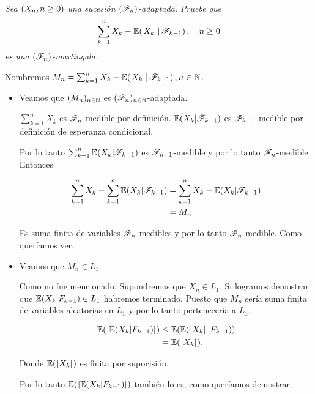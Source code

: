 \emph{
    Sea $\left( X_n,n\geq 0\right) $ una sucesi\'on $\left( \mathscr{F}_n\right) $-adaptada. Pruebe que
    \begin{align}
        \sum_{k=1}^n X_k-\espc{X_k}{\F_{k-1}}, \quad n\geq 0
    \end{align}
    es una $\left( \mathscr{F}_n\right) $-martingala.
}

\afterstatement\pn

Nombremos $M_n = \sum_{k=1}^n X_k-\espc{X_k}{\F_{k-1}}, n \in \N$.\pn

\begin{itemize}
	\item 
        Veamos que $(M_n)_{n \in \mathbb{N}}$ es $(\mathscr{F}_n)_{n \in \mathbb{N}}$-adaptada.\pn
    
        $\sum_{k = 1}^n X_k$ es $\mathscr{F}_n$-medible por definición. $\mathbb{E}(X_k | \mathscr{F}_{k-1})$ es $\mathscr{F}_{k-1}$-medible por definición
        de esperanza condicional. \pn
        
        Por lo tanto $\sum_{k = 1}^n \mathbb{E}(X_k | \mathscr{F}_{k-1})$ es $\mathscr{F}_{n-1}$-medible y por lo tanto
        $\mathscr{F}_n$-medible. Entonces
        
        \begin{align}
            \sum_{k = 1}^n X_k - \sum_{k = 1}^n \mathbb{E}(X_k | \mathscr{F}_{k-1}) &=  \sum_{k = 1}^n X_k - \mathbb{E}(X_k | \mathscr{F}_{k-1})    \\
                                                                    &=  M_n   
        \end{align}\pn
    
        Es suma finita de variables $\mathscr{F}_n$-medibles y por lo tanto $\mathscr{F}_n$-medible. Como queríamos ver.\pn
        
    \item
        Veamos que $M_n \in L_1$.\pn
        
        Como no fue mencionado. Supondremos que $X_n \in L_1$. Si logramos demostrar que $\mathbb{E}(X_k | F_{k-1}) \in L_1$ habremos terminado.
        Puesto que $M_n$ sería suma finita de variables aleatorias en $L_1$ y por lo tanto pertenecería a $L_1$.\pn
        
        \begin{align}
            \mathbb{E}(\hspace{.25mm}\left|\mathbb{E}(X_k | F_{k-1})\right|\hspace{.25mm})     &\leq   \mathbb{E}(\mathbb{E}(\hspace{.25mm}\left|X_k\right|\hspace{.25mm} | F_{k-1})) \\
                                            &=      \mathbb{E}(\hspace{.25mm}\left|X_k\right|\hspace{.25mm}). 
        \end{align}
        
        Donde $\mathbb{E}(\hspace{.25mm}\left|X_k\right|\hspace{.25mm})$ es finita por supocisión.\pn
        
        Por lo tanto $\mathbb{E}(\hspace{.25mm}\left|\mathbb{E}(X_k | F_{k-1})\right|\hspace{.25mm})$ también lo es, como queríamos demostrar.\pn



\end{itemize}
